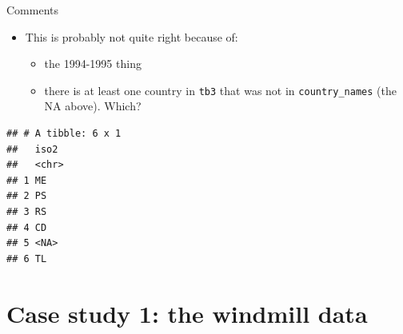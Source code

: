 \documentclass[ignorenonframetext,]{beamer}
\newenvironment{Shaded}{\begin{snugshade}}{\end{snugshade}}
\newcommand{\DataTypeTok}[1]{\textcolor[rgb]{0.13,0.29,0.53}{#1}}
\newcommand{\KeywordTok}[1]{\textcolor[rgb]{0.13,0.29,0.53}{\textbf{#1}}}
\newcommand{\NormalTok}[1]{#1}
\newcommand{\OperatorTok}[1]{\textcolor[rgb]{0.81,0.36,0.00}{\textbf{#1}}}
\newcommand{\StringTok}[1]{\textcolor[rgb]{0.31,0.60,0.02}{#1}}
\providecommand{\tightlist}{%
  \setlength{\itemsep}{0pt}\setlength{\parskip}{0pt}}
\begin{document}
\begin{frame}[fragile]{Comments}
\protect\hypertarget{comments-11}{}

\begin{itemize}
\tightlist
\item
  This is probably not quite right because of:

  \begin{itemize}
  \tightlist
  \item
    the 1994-1995 thing
  \item
    there is at least one country in \texttt{tb3} that was not in
    \texttt{country\_names} (the NA above). Which?
  \end{itemize}
\end{itemize}

\footnotesize

\begin{Shaded}
\end{Shaded}

\begin{verbatim}
## # A tibble: 6 x 1
##   iso2 
##   <chr>
## 1 ME   
## 2 PS   
## 3 RS   
## 4 CD   
## 5 <NA> 
## 6 TL
\end{verbatim}

\normalsize

\end{frame}

\hypertarget{case-study-1-the-windmill-data}{%
\section{Case study 1: the windmill
data}\label{case-study-1-the-windmill-data}}
\end{document}
